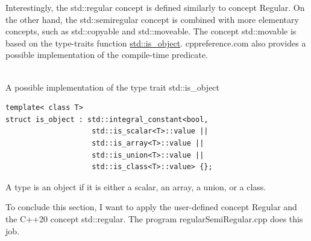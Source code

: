 Interestingly, the std::regular concept is defined similarly to concept Regular. On the other hand, the std::semiregular concept is combined with more elementary concepts, such as std::copyable and std::moveable. The concept std::movable is based on the type-traits function \href{https://en.cppreference.com/w/cpp/types/is_object}{std::is\_object}. cppreference.com also provides a possible implementation of the compile-time predicate.

\hspace*{\fill} \\ %
\noindent
A possible implementation of the type trait std::is\_object
\begin{lstlisting}[style=styleCXX]
template< class T>
struct is_object : std::integral_constant<bool,
					std::is_scalar<T>::value ||
					std::is_array<T>::value ||
					std::is_union<T>::value ||
					std::is_class<T>::value> {};
\end{lstlisting}

A type is an object if it is either a scalar, an array, a union, or a class.

To conclude this section, I want to apply the user-defined concept Regular and the C++20 concept std::regular. The program regularSemiRegular.cpp does this job.


